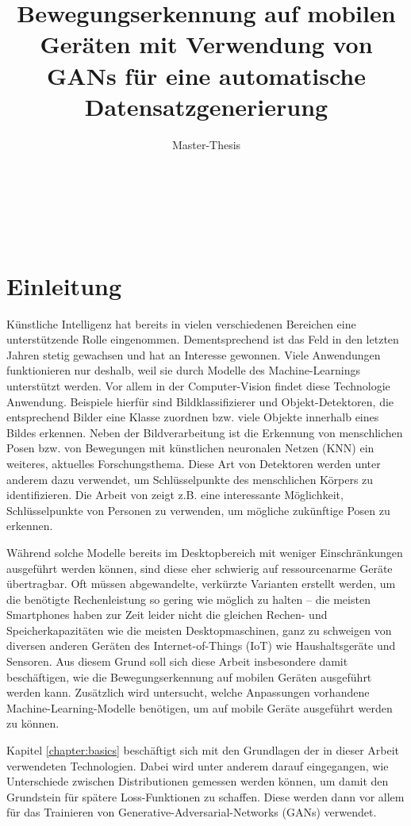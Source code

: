 \documentclass{hsflensburg}
\title{Bewegungserkennung auf mobilen Geräten mit Verwendung von GANs für eine
automatische Datensatzgenerierung}
\subtitle{Master-Thesis}
\author{
  \name{Florian Hansen}\\
  \institution{Hochschule Flensburg}
}
\begin{document}
  \maketitle
  \newpage \ \newpage
  \tableofcontents
  \newpage \ \newpage

  \chapter{Einleitung}
  Künstliche Intelligenz hat bereits in vielen verschiedenen Bereichen eine
  unterstützende Rolle eingenommen. Dementsprechend ist das Feld in den letzten
  Jahren stetig gewachsen und hat an Interesse gewonnen. Viele Anwendungen
  funktionieren nur deshalb, weil sie durch Modelle des Machine-Learnings
  unterstützt werden. Vor allem in der Computer-Vision findet diese Technologie
  Anwendung. Beispiele hierfür sind Bildklassifizierer und Objekt-Detektoren,
  die entsprechend Bilder eine Klasse zuordnen bzw. viele Objekte innerhalb
  eines Bildes erkennen. Neben der Bildverarbeitung ist die Erkennung von
  menschlichen Posen bzw. von Bewegungen mit künstlichen neuronalen Netzen (KNN)
  ein weiteres, aktuelles Forschungsthema. Diese Art von Detektoren werden unter
  anderem dazu verwendet, um Schlüs\-sel\-punkte des menschlichen Körpers zu
  identifizieren. Die Arbeit von \cite{barsoum2017hpgan} zeigt z.B. eine
  interessante Möglichkeit, Schlüsselpunkte von Personen zu verwenden, um
  mögliche zukünftige Posen zu erkennen.
  
  Während solche Modelle bereits im Desktopbereich mit weniger Einschränkungen
  ausgeführt werden können, sind diese eher schwierig auf ressourcenarme Geräte
  übertragbar. Oft müssen abgewandelte, verkürzte Varianten erstellt werden, um
  die benötigte Rechenleistung so gering wie möglich zu halten -- die meisten
  Smartphones haben zur Zeit leider nicht die gleichen Rechen- und
  Speicherkapazitäten wie die meisten Desktopmaschinen, ganz zu schweigen von
  diversen anderen Geräten des Internet-of-Things (IoT) wie Haushaltsgeräte und
  Sensoren. Aus diesem Grund soll sich diese Arbeit insbesondere damit
  beschäftigen, wie die Bewegungserkennung auf mobilen Geräten ausgeführt werden
  kann. Zusätzlich wird untersucht, welche Anpassungen vorhandene
  Machine-Learning-Modelle benötigen, um auf mobile Geräte ausgeführt werden zu
  können.

  Kapitel \ref{chapter:basics} beschäftigt sich mit den Grundlagen der in dieser
  Arbeit verwendeten Technologien. Dabei wird unter anderem darauf eingegangen,
  wie Unterschiede zwischen Distributionen gemessen werden können, um damit den
  Grundstein für spätere Loss-Funktionen zu schaffen. Diese werden dann vor
  allem für das Trainieren von Generative-Adversarial-Networks (GANs) verwendet.
\end{document}
